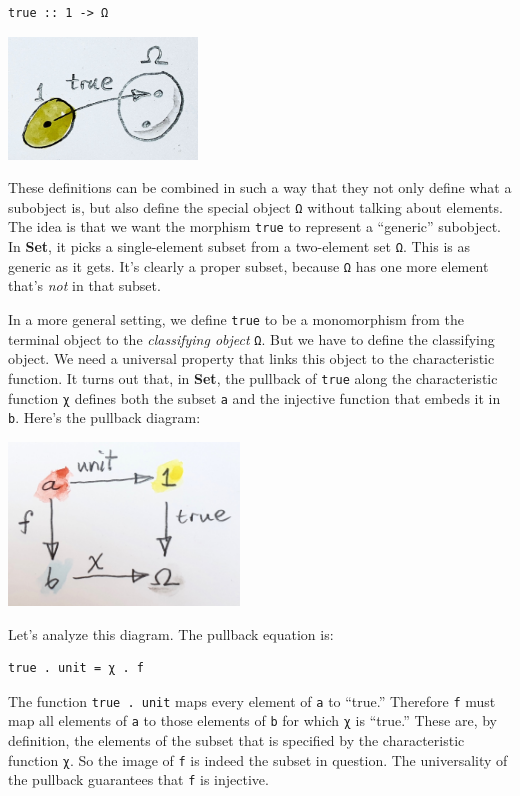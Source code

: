 \begin{verbatim}
true :: 1 -> Ω
\end{verbatim}

\includegraphics[width=1.97917in]{images/true.jpg}

These definitions can be combined in such a way that they not only
define what a subobject is, but also define the special object
\texttt{Ω} without talking about elements. The idea is that we want the
morphism \texttt{true} to represent a ``generic'' subobject. In
\textbf{Set}, it picks a single-element subset from a two-element set
\texttt{Ω}. This is as generic as it gets. It's clearly a proper subset,
because \texttt{Ω} has one more element that's \emph{not} in that
subset.

In a more general setting, we define \texttt{true} to be a monomorphism
from the terminal object to the \emph{classifying object} \texttt{Ω}.
But we have to define the classifying object. We need a universal
property that links this object to the characteristic function. It turns
out that, in \textbf{Set}, the pullback of \texttt{true} along the
characteristic function \texttt{χ} defines both the subset \texttt{a}
and the injective function that embeds it in \texttt{b}. Here's the
pullback diagram:

\includegraphics[width=2.41667in]{images/pullback.jpg}

Let's analyze this diagram. The pullback equation is:

\begin{verbatim}
true . unit = χ . f
\end{verbatim}

The function \texttt{true\ .\ unit} maps every element of \texttt{a} to
``true.'' Therefore \texttt{f} must map all elements of \texttt{a} to
those elements of \texttt{b} for which \texttt{χ} is ``true.'' These
are, by definition, the elements of the subset that is specified by the
characteristic function \texttt{χ}. So the image of \texttt{f} is indeed
the subset in question. The universality of the pullback guarantees that
\texttt{f} is injective.


